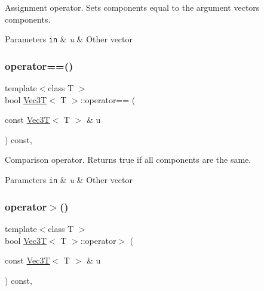 Assignment operator. Sets components equal to the argument vector\textquotesingle{}s components. 


\begin{DoxyParams}[1]{Parameters}
\mbox{\tt in}  & {\em u} & Other vector \\
\hline
\end{DoxyParams}
\mbox{\label{classVec3T_a715546682c26647643148a80087c4ab4}} 
\subsubsection{\texorpdfstring{operator==()}{operator==()}}
{\footnotesize\ttfamily template$<$class T $>$ \\
bool \hyperlink{classVec3T}{Vec3T}$<$ T $>$\+::operator== (\begin{DoxyParamCaption}\item[{const \hyperlink{classVec3T}{Vec3T}$<$ T $>$ \&}]{u }\end{DoxyParamCaption}) const\hspace{0.3cm}{\ttfamily [inline]}, {\ttfamily [noexcept]}}



Comparison operator. Returns true if all components are the same. 


\begin{DoxyParams}[1]{Parameters}
\mbox{\tt in}  & {\em u} & Other vector \\
\hline
\end{DoxyParams}
\mbox{\label{classVec3T_af99810068907e4935ac38bc397ba1102}} 
\subsubsection{\texorpdfstring{operator$>$()}{operator>()}}
{\footnotesize\ttfamily template$<$class T $>$ \\
bool \hyperlink{classVec3T}{Vec3T}$<$ T $>$\+::operator$>$ (\begin{DoxyParamCaption}\item[{const \hyperlink{classVec3T}{Vec3T}$<$ T $>$ \&}]{u }\end{DoxyParamCaption}) const\hspace{0.3cm}{\ttfamily [inline]}, {\ttfamily [noexcept]}}



